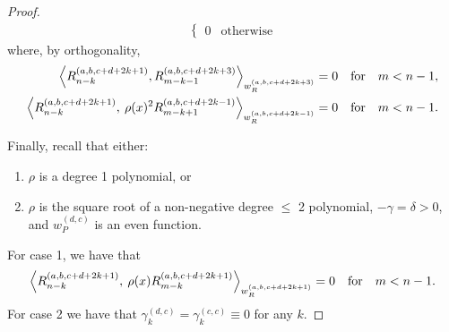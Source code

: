 \documentclass[11pt, oneside]{article}   	%
\newcommand{\genjac}{R}
\newcommand{\genjacnmk}{\genjac_{n-k}}
\newcommand{\genjacw}{w_\genjac}
\newcommand{\jacw}{w_P}
\begin{document}
\begin{proof}
\begin{align*}
\begin{cases}
		0 & \text{otherwise}
      	\end{cases}
\end{align*}
where, by orthogonality,
\begin{align*}
	\ip<\genjacnmk^{(a, b, c+d+2k+1)}, \genjac_{m-k-1}^{(a, b, c+d+2k+3)}>_{\genjacw^{(a, b, c+d+2k+3)}} &= 0 \qfor m < n-1, \\
	\ip<\genjacnmk^{(a, b, c+d+2k+1)}, \: \rho(x)^2 \genjac_{m-k+1}^{(a, b, c+d+2k-1)}>_{\genjacw^{(a, b, c+d+2k-1)}} &= 0 \qfor m < n-1.
\end{align*}

Finally, recall that either:
\begin{enumerate}
\item  \(\rho\) is a degree 1 polynomial, or 
\item \(\rho\) is the square root of a non-negative degree \(\le\) 2 polynomial, \(-\gamma = \delta > 0\), and \(\jacw^{(d,c)}\) is an even function.
\end{enumerate}
For case 1, we have that 
$$
\ip<\genjacnmk^{(a, b, c+d+2k+1)}, \: \rho(x) \genjac_{m-k}^{(a, b, c+d+2k+1)}>_{\genjacw^{(a, b, c+d+2k+1)}} = 0 \qfor m < n-1.
$$
For case 2 we have that $\gamma^{(d,c)}_{k} = \gamma^{(c,c)}_{k} \equiv 0$ for any $k$.

\end{proof}
\end{document}
